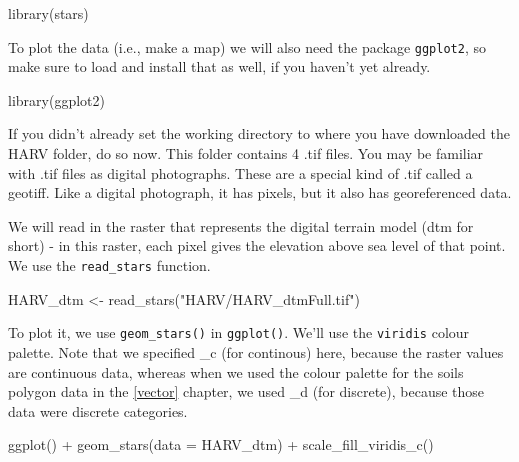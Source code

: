 \documentclass[
]{book}
\newenvironment{Shaded}{\begin{snugshade}}{\end{snugshade}}
\newcommand{\AttributeTok}[1]{\textcolor[rgb]{0.77,0.63,0.00}{#1}}
\newcommand{\FunctionTok}[1]{\textcolor[rgb]{0.00,0.00,0.00}{#1}}
\newcommand{\NormalTok}[1]{#1}
\newcommand{\OtherTok}[1]{\textcolor[rgb]{0.56,0.35,0.01}{#1}}
\newcommand{\SpecialCharTok}[1]{\textcolor[rgb]{0.00,0.00,0.00}{#1}}
\newcommand{\StringTok}[1]{\textcolor[rgb]{0.31,0.60,0.02}{#1}}
\begin{document}
\begin{Shaded}
\begin{Highlighting}[]
\FunctionTok{library}\NormalTok{(stars) }
\end{Highlighting}
\end{Shaded}

To plot the data (i.e., make a map) we will also need the package \texttt{ggplot2}, so make sure to load and install that as well, if you haven't yet already.

\begin{Shaded}
\begin{Highlighting}[]
\FunctionTok{library}\NormalTok{(ggplot2)}
\end{Highlighting}
\end{Shaded}

If you didn't already set the working directory to where you have downloaded the HARV folder, do so now. This folder contains 4 .tif files. You may be familiar with .tif files as digital photographs. These are a special kind of .tif called a geotiff. Like a digital photograph, it has pixels, but it also has georeferenced data.

We will read in the raster that represents the digital terrain model (dtm for short) - in this raster, each pixel gives the elevation above sea level of that point. We use the \texttt{read\_stars} function.

\begin{Shaded}
\begin{Highlighting}[]
\NormalTok{HARV\_dtm }\OtherTok{\textless{}{-}} \FunctionTok{read\_stars}\NormalTok{(}\StringTok{"HARV/HARV\_dtmFull.tif"}\NormalTok{)}
\end{Highlighting}
\end{Shaded}

To plot it, we use \texttt{geom\_stars()} in \texttt{ggplot()}. We'll use the \texttt{viridis} colour palette. Note that we specified \_c (for continous) here, because the raster values are continuous data, whereas when we used the colour palette for the soils polygon data in the \ref{vector} chapter, we used \_d (for discrete), because those data were discrete categories.

\begin{Shaded}
\begin{Highlighting}[]
\FunctionTok{ggplot}\NormalTok{() }\SpecialCharTok{+}
  \FunctionTok{geom\_stars}\NormalTok{(}\AttributeTok{data =}\NormalTok{ HARV\_dtm) }\SpecialCharTok{+}
  \FunctionTok{scale\_fill\_viridis\_c}\NormalTok{()}
\end{Highlighting}
\end{Shaded}
\end{document}
